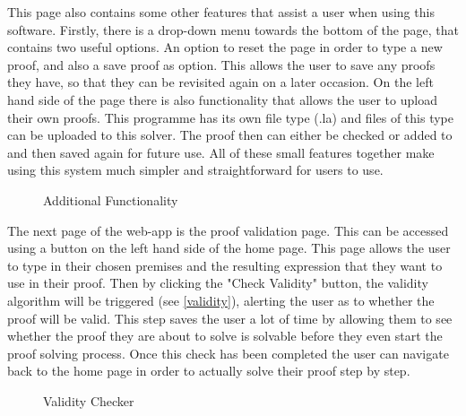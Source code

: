 This page also contains some other features that assist a user when using this software. Firstly, there is a drop-down menu towards the bottom of the page, that contains two useful options. An option to reset the page in order to type a new proof, and also a save proof as option. This allows the user to save any proofs they have, so that they can be revisited again on a later occasion. On the left hand side of the page there is also functionality that allows the user to upload their own proofs. This programme has its own file type (.la) and files of this type can be uploaded to this solver. The proof then can either be checked or added to and then saved again for future use. All of these small features together make using this system much simpler and straightforward for users to use.

\begin{figure}[!ht]
	\centering
	\caption{Additional Functionality}
\end{figure}



The next page of the web-app is the proof validation page. This can be accessed using a button on the left hand side of the home page. This page allows the user to type in their chosen premises and the resulting expression that they want to use in their proof. Then by clicking the "Check Validity" button, the validity algorithm will be triggered (see \ref{validity}), alerting the user as to whether the proof will be valid. This step saves the user a lot of time by allowing them to see whether the proof they are about to solve is solvable before they even start the proof solving process. Once this check has been completed the user can navigate back to the home page in order to actually solve their proof step by step.

\begin{figure}[!ht]
	\centering
	\caption{Validity Checker}
\end{figure}

